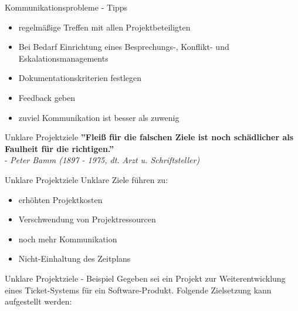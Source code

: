 \documentclass[12pt]{beamer}
\begin{document}
	\begin{frame}{Kommunikationsprobleme - Tipps}
		\begin{itemize}
			\item{regelmäßige Treffen mit allen Projektbeteiligten}
			\item{Bei Bedarf Einrichtung eines Besprechungs-, Konflikt- und Eskalationsmanagements}
			\item{Dokumentationskriterien festlegen}
			\item{Feedback geben}
			\item{zuviel Kommunikation ist besser als zuwenig}
		\end{itemize}
	\end{frame}


	\begin{frame}{Unklare Projektziele}
		\textbf{''Fleiß für die falschen Ziele ist noch schädlicher als Faulheit für die richtigen.''} \\
		- \textit{Peter Bamm (1897 - 1975, dt. Arzt u. Schriftsteller)}
	\end{frame}

	
	\begin{frame}{Unklare Projektziele}
		Unklare Ziele führen zu:
		\begin{itemize}
			\item{erhöhten Projektkosten}
			\item{Verschwendung von Projektressourcen}
			\item{noch mehr Kommunikation}
			\item{Nicht-Einhaltung des Zeitplans}
		\end{itemize}

	\end{frame}

	\begin{frame}{Unklare Projektziele - Beispiel}
		Gegeben sei ein Projekt zur Weiterentwicklung eines Ticket-Systems für ein Software-Produkt. Folgende Zielsetzung kann aufgestellt werden: \\

		
	\end{frame}
\end{document}
